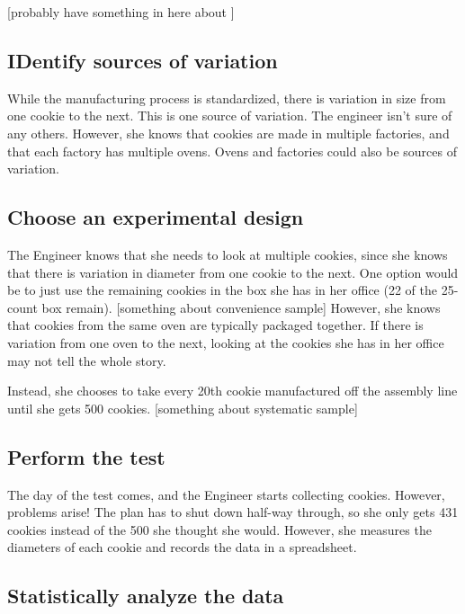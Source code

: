 \documentclass[]{book}
\begin{document}
{[}probably have something in here about {]}

\subsection{IDentify sources of
variation}\label{identify-sources-of-variation}

While the manufacturing process is standardized, there is variation in
size from one cookie to the next. This is one source of variation. The
engineer isn't sure of any others. However, she knows that cookies are
made in multiple factories, and that each factory has multiple ovens.
Ovens and factories could also be sources of variation.

\subsection{Choose an experimental
design}\label{choose-an-experimental-design-2}

The Engineer knows that she needs to look at multiple cookies, since she
knows that there is variation in diameter from one cookie to the next.
One option would be to just use the remaining cookies in the box she has
in her office (22 of the 25-count box remain). {[}something about
convenience sample{]} However, she knows that cookies from the same oven
are typically packaged together. If there is variation from one oven to
the next, looking at the cookies she has in her office may not tell the
whole story.

Instead, she chooses to take every 20th cookie manufactured off the
assembly line until she gets 500 cookies. {[}something about systematic
sample{]}

\subsection{Perform the test}\label{perform-the-test}

The day of the test comes, and the Engineer starts collecting cookies.
However, problems arise! The plan has to shut down half-way through, so
she only gets 431 cookies instead of the 500 she thought she would.
However, she measures the diameters of each cookie and records the data
in a spreadsheet.

\subsection{Statistically analyze the
data}\label{statistically-analyze-the-data-2}
\end{document}
